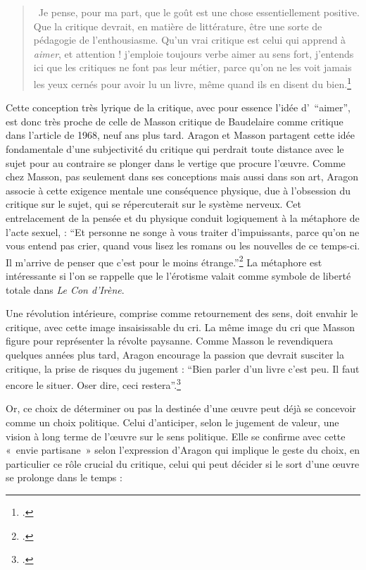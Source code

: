      \begin{quote}
       Je pense, pour ma part, que le goût est une chose essentiellement positive. Que la critique devrait, en matière de littérature, être une sorte de pédagogie de l’enthousiasme. Qu’un vrai critique est celui qui apprend à \emph{aimer}, et attention ! j’emploie toujours verbe aimer au sens fort, j’entends ici que les critiques ne font pas leur métier, parce qu’on ne les voit jamais les yeux cernés pour avoir lu un livre, même quand ils en disent du bien.\footcite{atraversgaleries}    
     \end{quote}


	 Cette conception très lyrique de la critique, avec pour essence l’idée d’ \enquote{aimer}, est donc très proche de celle de Masson critique de Baudelaire comme critique dans l’article de 1968, neuf ans plus tard. Aragon et Masson partagent cette idée fondamentale d’une subjectivité du critique qui perdrait toute distance avec le sujet pour au contraire se plonger dans le vertige que procure l’\oe{}uvre. Comme chez Masson, pas seulement dans ses conceptions mais aussi dans son art, Aragon associe à cette exigence mentale une conséquence physique, due à l’obsession du critique sur le sujet, qui se répercuterait sur le système nerveux. Cet entrelacement de la pensée et du physique conduit logiquement à la métaphore de l’acte sexuel, : \enquote{Et personne ne songe à vous traiter d’impuissants, parce qu’on ne vous entend pas crier, quand vous lisez les romans ou les nouvelles de ce temps-ci. Il m’arrive de penser que c’est pour le moins étrange.}\footcite{savoiraimer} La métaphore est intéressante si l'on se rappelle que le l'érotisme valait comme symbole de liberté totale dans \emph{Le Con d'Irène}. 

     	Une révolution intérieure, comprise comme retournement des sens, doit envahir le critique, avec cette image insaisissable du cri. La même image du cri que Masson figure pour représenter la révolte paysanne. Comme Masson le revendiquera quelques années plus tard, Aragon encourage la passion que devrait susciter la critique, la prise de risques du jugement : \enquote{Bien parler d’un livre c’est peu. Il faut encore le situer. Oser dire, ceci restera}.\footcite{savoiraimer}

 Or, ce choix de déterminer ou pas la destinée d’une \oe{}uvre peut déjà se concevoir comme un choix politique. Celui d’anticiper, selon le jugement de valeur, une vision à long terme de l’\oe{}uvre sur le sens politique. Elle se confirme avec cette « envie partisane » selon l’expression d’Aragon qui implique le geste du choix, en  particulier ce rôle crucial du critique, celui qui peut décider si le sort d’une \oe{}uvre se prolonge dans le temps : 

